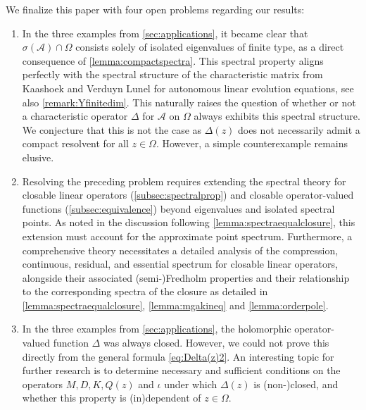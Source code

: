 \documentclass[english]{myarticle}
\begin{document}
\begin{sloppypar}
We finalize this paper with four open problems regarding our results:
\begin{enumerate}
    \item In the three examples from \cref{sec:applications}, it became clear that $\sigma(\mathcal{A}) \cap \Omega$ consists solely of isolated eigenvalues of finite type, as a direct consequence of \cref{lemma:compactspectra}. This spectral property aligns perfectly with the spectral structure of the characteristic matrix from Kaashoek and Verduyn Lunel \cite{Kaashoek1992} for autonomous linear evolution equations, see also \cref{remark:Yfinitedim}. This naturally raises the question of whether or not a characteristic operator $\Delta$ for $\mathcal{A}$ on $\Omega$ always exhibits this spectral structure. We conjecture that this is not the case as $\Delta(z)$ does not necessarily admit a compact resolvent for all $z \in \Omega$. However, a simple counterexample remains elusive.

    \item Resolving the preceding problem requires extending the spectral theory for closable linear operators (\cref{subsec:spectralprop}) and closable operator-valued functions (\cref{subsec:equivalence}) beyond eigenvalues and isolated spectral points. As noted in the discussion following \cref{lemma:spectraequalclosure}, this extension must account for the approximate point spectrum. Furthermore, a comprehensive theory necessitates a detailed analysis of the compression, continuous, residual, and essential spectrum for closable linear operators, alongside their associated (semi-)Fredholm properties and their relationship to the corresponding spectra of the closure as detailed in \cref{lemma:spectraequalclosure}, \cref{lemma:mgakineq} and \cref{lemma:orderpole}.
    
    \item In the three examples from \cref{sec:applications}, 
    the holomorphic operator-valued function $\Delta$ was always closed. However, we could not prove this directly from the general formula \eqref{eq:Delta(z)2}. An interesting topic for further research is to determine necessary and sufficient conditions on the operators $M, D, K, Q(z)$ and $\iota$ under which $\Delta(z)$ is (non-)closed, and whether this property is (in)dependent of $z \in \Omega$.
    

\end{enumerate}
\end{sloppypar}
\end{document}
